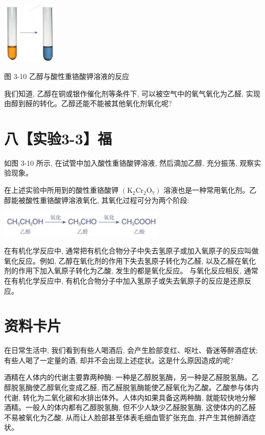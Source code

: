 \documentclass[10pt]{article}
\begin{document}
\begin{center}
\includegraphics[max width=0.2\textwidth]{images/0190efc5-b58a-7c43-bfb0-e0a030df9cfd_67_823220.jpg}
\end{center}

图 3-10 乙醇与酸性重铬酸钾溶液的反应

我们知道, 乙醇在铜或银作催化剂等条件下, 可以被空气中的氧气氧化为乙醛, 实现由醇到醛的转化。乙醇还能不能被其他氧化剂氧化呢?

\section*{八【实验3-3】福}

如图 3-10 所示, 在试管中加入酸性重铬酸钾溶液, 然后滴加乙醇, 充分振荡, 观察实验现象。

在上述实验中所用到的酸性重铬酸钾 \(\left( {{\mathrm{K}}_{2}{\mathrm{{Cr}}}_{2}{\mathrm{O}}_{7}}\right)\) 溶液也是一种常用氧化剂。乙醇能被酸性重铬酸钾溶液氧化, 其氧化过程可分为两个阶段:

\begin{center}
\includegraphics[max width=0.6\textwidth]{images/0190efc5-b58a-7c43-bfb0-e0a030df9cfd_68_153651.jpg}
\end{center}

在有机化学反应中, 通常把有机化合物分子中失去氢原子或加入氧原子的反应叫做氧化反应。例如, 乙醇在氧化剂的作用下失去氢原子转化为乙醛, 以及乙醛在氧化剂的作用下加入氧原子转化为乙酸, 发生的都是氧化反应。 与氧化反应相反, 通常在有机化学反应中, 有机化合物分子中加入氢原子或失去氧原子的反应是还原反应。

\section*{资料卡片}

在日常生活中, 我们看到有些人喝酒后, 会产生脸部变红、呕吐、昏迷等醉酒症状; 有些人喝了一定量的酒, 却并不会出现上述症状。这是什么原因造成的呢?

酒精在人体内的代谢主要靠两种酶: 一种是乙醇脱氢酶，另一种是乙醛脱氢酶。乙醇脱氢酶使乙醇氧化变成乙醛, 而乙醛脱氢酶能使乙醛氧化为乙酸。乙酸参与体内代谢, 转化为二氧化碳和水排出体外。人体内如果具备这两种酶, 就能较快地分解酒精。一般人的体内都有乙醇脱氢酶, 但不少人缺少乙醛脱氢酶, 这使体内的乙醛不易被氧化为乙酸, 从而让人脸部甚至体表毛细血管扩张充血, 并产生其他醉酒症状。
\end{document}
